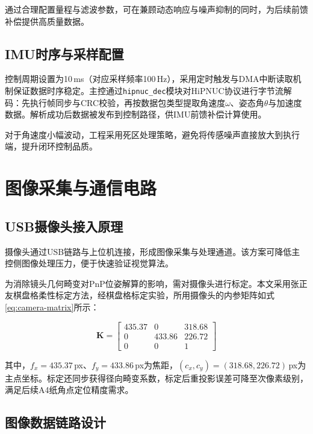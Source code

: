通过合理配置量程与滤波参数，可在兼顾动态响应与噪声抑制的同时，为后续前馈补偿提供高质量数据。

\subsection{IMU时序与采样配置}

控制周期设置为10\,ms（对应采样频率100\,Hz），采用定时触发与DMA中断读取机制保证数据时序稳定。主控通过\texttt{hipnuc\_dec}模块对HiPNUC协议进行字节流解码：先执行帧同步与CRC校验，再按数据包类型提取角速度$\omega$、姿态角$\theta$与加速度数据。解析成功后数据被发布到控制路径，供IMU前馈补偿计算使用。

对于角速度小幅波动，工程采用死区处理策略，避免将传感噪声直接放大到执行端，提升闭环控制品质。

\FloatBarrier

\section{图像采集与通信电路}

\subsection{USB摄像头接入原理}

摄像头通过USB链路与上位机连接，形成图像采集与处理通道。该方案可降低主控侧图像处理压力，便于快速验证视觉算法。

为消除镜头几何畸变对PnP位姿解算的影响，需对摄像头进行标定。本文采用张正友棋盘格柔性标定方法\cite{Zhang2000calibration}，经棋盘格标定实验，所用摄像头的内参矩阵如式\eqref{eq:camera-matrix}所示：

\begin{equation}
\mathbf{K} = \begin{bmatrix} 435.37 & 0 & 318.68 \\ 0 & 433.86 & 226.72 \\ 0 & 0 & 1 \end{bmatrix}
\label{eq:camera-matrix}
\end{equation}

其中，$f_x{=}435.37$\,px、$f_y{=}433.86$\,px为焦距，$(c_x, c_y){=}(318.68, 226.72)$\,px为主点坐标。标定还同步获得径向畸变系数，标定后重投影误差可降至次像素级别，满足后续A4纸角点定位精度需求。

\subsection{图像数据链路设计}

